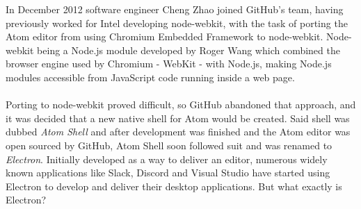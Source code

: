 In December 2012 software engineer Cheng Zhao joined GitHub's team, having previously worked for Intel developing
node-webkit, with the task of porting the Atom editor from using Chromium Embedded Framework to node-webkit.
Node-webkit being a Node.js module developed by Roger Wang which combined the browser engine used by Chromium - WebKit - 
with Node.js, making Node.js modules accessible from JavaScript code running inside a web page. \parencite{jensen2017}\paragraph{}

Porting to node-webkit proved difficult, so GitHub abandoned that approach, and it was decided that a new native shell
for Atom would be created.
Said shell was dubbed \emph{Atom Shell} and after development was finished and the Atom editor was open sourced
by GitHub, Atom Shell soon followed suit and was renamed to \emph{Electron}.
Initially developed as a way to deliver an editor, numerous widely known applications like Slack, Discord and Visual
Studio have started using Electron to develop and deliver their desktop applications.\parencite{electronDocs}
But what exactly is Electron?\paragraph{}